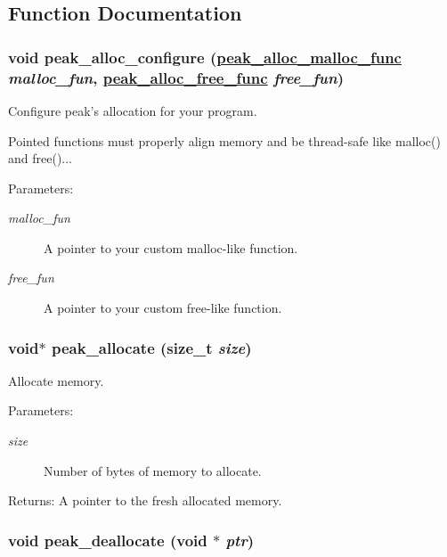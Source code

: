 \subsection{Function Documentation}
\hypertarget{group__alloc_ga2}{
\subsubsection[peak\_\-alloc\_\-configure]{\setlength{\rightskip}{0pt plus 5cm}void peak\_\-alloc\_\-configure (\hyperlink{group__alloc_ga0}{peak\_\-alloc\_\-malloc\_\-func} {\em malloc\_\-fun}, \hyperlink{group__alloc_ga1}{peak\_\-alloc\_\-free\_\-func} {\em free\_\-fun})}}
\label{group__alloc_ga2}


Configure peak's allocation for your program. 

Pointed functions must properly align memory and be thread-safe like malloc() and free()...

\begin{Desc}
\item[Parameters:]
\begin{description}
\item[{\em malloc\_\-fun}]A pointer to your custom malloc-like function. \item[{\em free\_\-fun}]A pointer to your custom free-like function. \end{description}
\end{Desc}
\hypertarget{group__alloc_ga3}{
\subsubsection[peak\_\-allocate]{\setlength{\rightskip}{0pt plus 5cm}void$\ast$ peak\_\-allocate (size\_\-t {\em size})}}
\label{group__alloc_ga3}


Allocate memory. 

\begin{Desc}
\item[Parameters:]
\begin{description}
\item[{\em size}]Number of bytes of memory to allocate.\end{description}
\end{Desc}
\begin{Desc}
\item[Returns:]A pointer to the fresh allocated memory. \end{Desc}
\hypertarget{group__alloc_ga4}{
\subsubsection[peak\_\-deallocate]{\setlength{\rightskip}{0pt plus 5cm}void peak\_\-deallocate (void $\ast$ {\em ptr})}}
\label{group__alloc_ga4}



